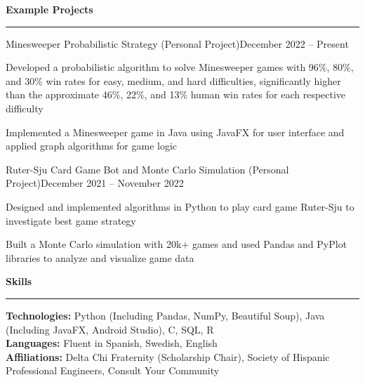 \documentclass{article}
\newcommand{\horizontal}{\vspace{2pt}\hrule}
\newcommand{\sectitle}[1]{\vspace{2pt} \textbf{\large #1} \horizontal}
\newcommand{\skill}[2]{\textbf{#1:} #2}
\begin{document}
\begin{flushleft}
\sectitle{Example Projects}

    \vspace{3pt}

    \begin{subexperience}{Minesweeper Probabilistic Strategy (Personal Project)}{December 2022 -- Present}
        \item Developed a probabilistic algorithm to solve Minesweeper games with 96\%, 80\%, and 30\% win rates for easy, medium, and hard difficulties, significantly higher than the approximate 46\%, 22\%, and 13\% human win rates for each respective difficulty
        \item Implemented a Minesweeper game in Java using JavaFX for user interface and applied graph algorithms for game logic
    \end{subexperience}

    \begin{subexperience}{Ruter-Sju Card Game Bot and Monte Carlo Simulation (Personal Project)}{December 2021 -- November 2022}
        \item Designed and implemented algorithms in Python to play card game Ruter-Sju to investigate best game strategy
        \item Built a Monte Carlo simulation with 20k+ games and used Pandas and PyPlot libraries to analyze and visualize game data
    \end{subexperience}

\sectitle{Skills}

    \vspace{3pt}
    \skill{Technologies}{Python (Including Pandas, NumPy, Beautiful Soup), Java (Including JavaFX, Android Studio), C, SQL, R} \\
    \skill{Languages}{Fluent in Spanish, Swedish, English} \\
    \skill{Affiliations}{Delta Chi Fraternity (Scholarship Chair), Society of Hispanic Professional Engineers, Consult Your Community}

\end{flushleft}
\end{document}
